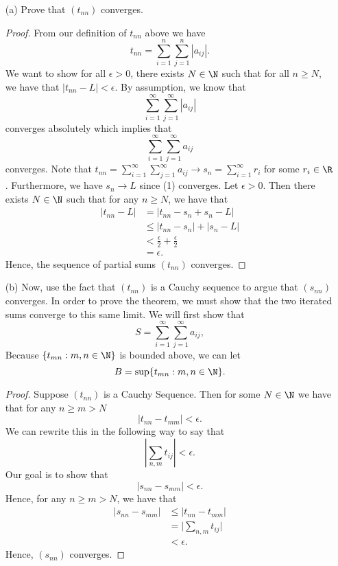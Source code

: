 \begin{enumerate}
    \item[(a)] Prove that \( (t_{nn})\) converges. 
        \begin{proof}
            From our definition of \( t_{nn}\) above we have 
            \[ t_{nn} = \sum_{ i=1 }^{ n } \sum_{ j=1 }^{ n } | a_{ij} |.\] 
            We want to show for all \(\epsilon > 0 \), there exists \( N \in \N \) such that for all \( n \geq  N \), we have that  \( |t_{nn} - L  | < \epsilon \). By assumption, we know that 
            \[  \sum_{ i=1 }^{ \infty  } \sum_{ j=1 }^{ \infty  } | a_{ij} |  \tag{1}\] 
            converges absolutely which implies that 
            \[  \sum_{ i=1 }^{ \infty  } \sum_{ j=1 }^{ \infty   } a_{ij} \] 
            converges. Note that \( t_{nn} = \sum_{ i=1 }^{ \infty   } \sum_{ j=1 }^{ \infty  } a_{ij}  \to s_n = \sum_{ i=1 }^{ \infty  } r_i \) for some \( r_i \in \R  \). Furthermore, we have \( s_n \to L  \) since (1) converges. Let \( \epsilon  > 0  \). Then there exists \(  N \in \N  \) such that for any \(  n \geq N  \), we have that 
            \begin{align*}
                | t_{nn} - L  | &= | t_{nn} -s_n + s_n - L |  \\
                                &\leq  | t_{nn} - s_n  | + | s_n - L  | \\
                                &< \frac{ \epsilon  }{ 2 } + \frac{ \epsilon  }{ 2 } \\
                                &= \epsilon.
            \end{align*}
            Hence, the sequence of partial sums \(  (t_{nn}) \) converges. 
        \end{proof}
    \item[(b)] Now, use the fact that \( (t_{nn})\) is a Cauchy sequence to argue that \( (s_{nn})\) converges. In order to prove the theorem, we must show that the two iterated sums converge to this same limit. We will first show that 
        \[ S = \sum_{ i=1 }^{ \infty  } \sum_{ j=1 }^{ \infty  } a_{ij}, \] 
        Because \( \{ t_{mn} : m,n \in \N  \} \) is bounded above, we can let 
        \[ B = \sup \{ t_{mn}: m,n \in \N  \}.\] 
        \begin{proof}
        Suppose \( (t_{nn}) \) is a Cauchy Sequence. Then for some \( N \in \N \) we have that for any \( n \geq m > N  \)
        \[  | t_{nn} - t_{mm} | < \epsilon.  \]
        We can rewrite this in the following way to say that 
        \[  | \sum_{ n,m } t_{ij} | < \epsilon.    \]
        Our goal is to show that 
        \[  | s_{nn} - s_{mm} | < \epsilon.   \]
        Hence, for any \( n \geq  m > N  \), we have that 
        \begin{align*}
            | s_{nn} - s_{mm } | &\leq | t_{nn} - t_{m m }|  \\
                                 &= \Big| \sum_{ n,m } t_{ij} \Big|  \\
                                 &< \epsilon.
        \end{align*}
        Hence, \( (s_{nn}) \) converges.


\end{proof}
\end{enumerate}
